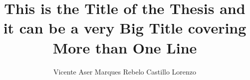 \documentclass[a4paper]{article}
\begin{document}
\title{This is the Title of the Thesis and it can be a very Big Title covering More than One Line} %
\author{Vicente Aser Marques Rebelo Castillo Lorenzo}

\maketitle
\thispagestyle{empty}

\setlength{\abstitleskip}{-\absparindent}


\tableofcontents
\thispagestyle{empty}
\clearpage













\clearpage
{}
\normalem

\ULforem

\end{document}

